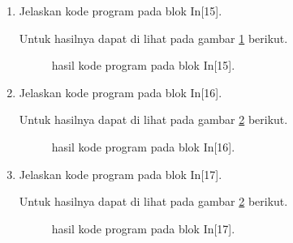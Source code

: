 \begin{enumerate}
\item Jelaskan kode program pada blok  In[15].

Untuk hasilnya dapat di lihat pada gambar \ref{c155} berikut.
\begin{figure}[!htbp]
      \caption{hasil kode program pada blok  In[15].}
      \label{c155}
      \end{figure}

\item Jelaskan kode program pada blok  In[16].

Untuk hasilnya dapat di lihat pada gambar \ref{c156} berikut.
\begin{figure}[!htbp]
      \caption{hasil kode program pada blok  In[16].}
      \label{c156}
      \end{figure}

\item Jelaskan kode program pada blok  In[17].

Untuk hasilnya dapat di lihat pada gambar \ref{c156} berikut.
\begin{figure}[!htbp]
      \caption{hasil kode program pada blok  In[17].}
      \label{c157}
      \end{figure}


\end{enumerate}
